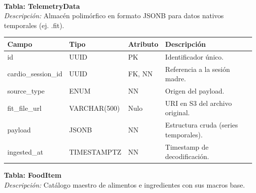 \documentclass[12pt]{article}
\begin{document}
\\
\noindent\textbf{Tabla: TelemetryData} \\
\textit{Descripción:} Almacén polimórfico en formato JSONB para datos nativos temporales (ej. .fit).
\begin{table}[h!]
    \centering
    \renewcommand{\arraystretch}{1.2}
    \small
    \begin{tabular}{|p{3.5cm}|p{2.7cm}|p{2cm}|p{6.5cm}|}
        \hline
        \rowcolor[HTML]{EFEFEF}
        \textbf{Campo} & \textbf{Tipo} & \textbf{Atributo} & \textbf{Descripción} \\ \hline
        id & UUID & PK & Identificador único. \\ \hline
        cardio\_session\_id & UUID & FK, NN & Referencia a la sesión madre. \\ \hline
        source\_type & ENUM & NN & Origen del payload. \\ \hline
        fit\_file\_url & VARCHAR(500) & Nulo & URI en S3 del archivo original. \\ \hline
        payload & JSONB & NN & Estructura cruda (series temporales). \\ \hline
        ingested\_at & TIMESTAMPTZ & NN & Timestamp de decodificación. \\ \hline
    \end{tabular}
\end{table}
\newpage
\noindent\textbf{Tabla: FoodItem} \\
\textit{Descripción:} Catálogo maestro de alimentos e ingredientes con sus macros base.
\end{document}
